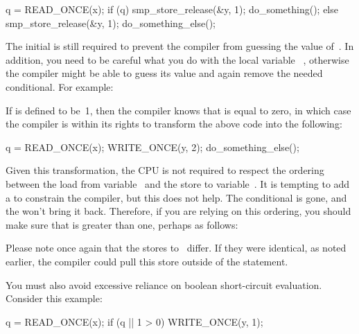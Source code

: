 \begin{VerbatimN}
q = READ_ONCE(x);
if (q) {
	smp_store_release(&y, 1);
	do_something();
} else {
	smp_store_release(&y, 1);
	do_something_else();
}
\end{VerbatimN}

The initial  is still required to prevent the compiler from
guessing the value of~.
In addition, you need to be careful what you do with the local variable~%
,
otherwise the compiler might be able to guess its value and again remove
the needed conditional.
For example:


If  is defined to be~1, then the compiler knows that  is
equal to zero, in which case the compiler is within its rights to
transform the above code into the following:

\begin{VerbatimN}
q = READ_ONCE(x);
WRITE_ONCE(y, 2);
do_something_else();
\end{VerbatimN}

Given this transformation, the CPU is not required to respect the ordering
between the load from variable~ and the store to variable~.
It is tempting to add a  to constrain the compiler,
but this does not help.
The conditional is gone, and the  won't bring it back.
Therefore, if you are relying on this ordering, you should make sure
that  is greater than one, perhaps as follows:


Please note once again that the stores to~ differ.
If they were identical, as noted earlier, the compiler could pull this
store outside of the  statement.

You must also avoid excessive reliance on boolean short-circuit evaluation.
Consider this example:

\begin{VerbatimN}
q = READ_ONCE(x);
if (q || 1 > 0)
	WRITE_ONCE(y, 1);
\end{VerbatimN}

